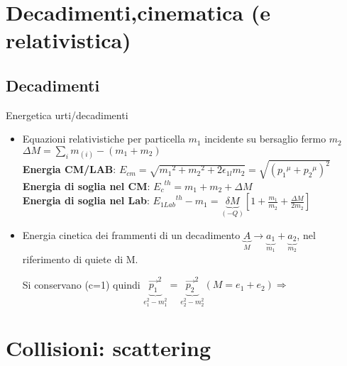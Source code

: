 \section{Decadimenti,cinematica (e relativistica)}

\subsection{Decadimenti}

\begin{frame}{Energetica urti/decadimenti}
    \begin{itemize}
\item Equazioni relativistiche per particella $m_1$ incidente su bersaglio fermo $m_2$\\
$\Delta M=\sum_im_{(i)}-(m_1+m_2)$\\
\textbf{Energia CM/LAB}: $E_{cm}=\sqrt{{m_1}^2+{m_2}^2+2\epsilon_{1l}m_2}=\sqrt{({p_1}^{\mu}+{p_2}^{\mu})^2}$\\
\textbf{Energia di soglia nel CM}: ${E_c}^{th}=m_1+m_2+\Delta M$\\
\textbf{Energia di soglia nel Lab}: ${E_{1Lab}}^{th}-m_1=\underbrace{\delta M}_{(-Q)}[1+\frac{m_1}{m_2}+\frac{\Delta M}{2m_2}]$
\item Energia cinetica dei frammenti di un decadimento $\underbrace{A}_M\rightarrow \underbrace{a_1}_{m_1}+\underbrace{a_2}_{m_2}$, nel riferimento di quiete di M.

 Si conservano (c=1) 
quindi $\underbrace{\vec{p_1}^2}_{e_1^2-m_1^2}=\underbrace{\vec{p_2}^2}_{e_2^2-m_2^2} (M=e_1+e_2) \Rightarrow$

\end{itemize}

\end{frame}


\section{Collisioni: scattering}

